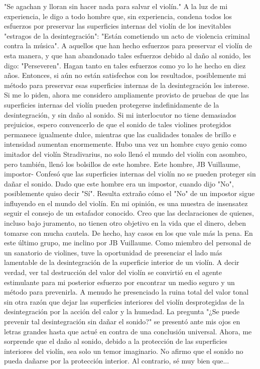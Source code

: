 "Se agachan y lloran sin hacer nada para salvar el violín." A la luz de mi experiencia, le digo a todo hombre que, sin experiencia, condena todos los esfuerzos por preservar las superficies internas del violín de los inevitables "estragos de la desintegración": "Están cometiendo un acto de violencia criminal contra la música". A aquellos que han hecho esfuerzos para preservar el violín de esta manera, y que han abandonado tales esfuerzos debido al daño al sonido, les digo: "Perseveren". Hagan tanto en tales esfuerzos como yo lo he hecho en diez años. Entonces, si aún no están satisfechos con los resultados, posiblemente mi método para preservar esas superficies internas de la desintegración les interese. Si me lo piden, ahora me considero ampliamente provisto de pruebas de que las superficies internas del violín pueden protegerse indefinidamente de la desintegración, y sin daño al sonido. Si mi interlocutor no tiene demasiados prejuicios, espero convencerlo de que el sonido de tales violines protegidos permanece igualmente dulce, mientras que las cualidades tonales de brillo e intensidad aumentan enormemente. Hubo una vez un hombre cuyo genio como imitador del violín Stradivarius, no solo llenó el mundo del violín con asombro, pero también, llenó los bolsillos de este hombre. Este hombre, JB Vuillaume, impostor-
Confesó que las superficies internas del violín no se pueden proteger sin dañar el sonido. Dado que este hombre era un impostor, cuando dijo "No", posiblemente quiso decir "Sí".
Resulta extraño cómo el "No" de un impostor sigue influyendo en el mundo del violín. En mi opinión, es una muestra de insensatez seguir el consejo de un estafador conocido. Creo que las declaraciones de quienes, incluso bajo juramento, no tienen otro objetivo en la vida que el dinero, deben tomarse con mucha cautela. De hecho, hay casos en los que vale más la pena. En este último grupo, me inclino por JB Vuillaume.
Como miembro del personal de un sanatorio de violines, tuve la oportunidad de presenciar el lado más lamentable de la desintegración de la superficie interior de un violín. A decir verdad, ver tal destrucción del valor del violín se convirtió en el agente estimulante para mi posterior esfuerzo por encontrar un medio seguro y un método para prevenirla. A menudo he presenciado la ruina total del valor tonal sin otra razón que dejar las superficies interiores del violín desprotegidas de la desintegración por la acción del calor y la humedad. La pregunta "¿Se puede prevenir tal desintegración sin dañar el sonido?" se presentó ante mis ojos en letras grandes hasta que actué en contra de una conclusión universal. Ahora, me sorprende que el daño al sonido, debido a la protección de las superficies interiores del violín, sea solo un temor imaginario. No afirmo que el sonido no pueda dañarse por la protección interior. Al contrario, sé muy bien que...
